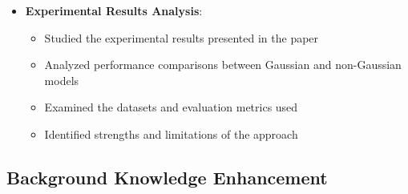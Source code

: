 \documentclass{article}
\begin{document}
\begin{itemize}
  \item \textbf{Experimental Results Analysis}:
  \begin{itemize}
    \item Studied the experimental results presented in the paper
    \item Analyzed performance comparisons between Gaussian and non-Gaussian models
    \item Examined the datasets and evaluation metrics used
    \item Identified strengths and limitations of the approach
  \end{itemize}
\end{itemize}

\subsection{Background Knowledge Enhancement}
\end{document}
